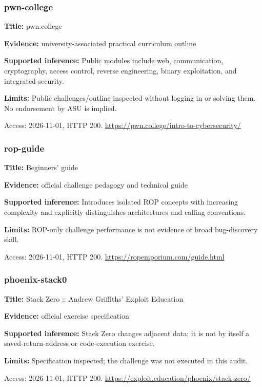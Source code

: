 \subsubsection{pwn-college}
\noindent\textbf{Title:} pwn.college\par
\noindent\textbf{Evidence:} university-associated practical curriculum outline\par
\noindent\textbf{Supported inference:} Public modules include web, communication, cryptography, access control, reverse engineering, binary exploitation, and integrated security.\par
\noindent\textbf{Limits:} Public challenges/outline inspected without logging in or solving them. No endorsement by ASU is implied.\par
\noindent Access: 2026-11-01, HTTP 200. \url{https://pwn.college/intro-to-cybersecurity/}
\subsubsection{rop-guide}
\noindent\textbf{Title:} Beginners' guide\par
\noindent\textbf{Evidence:} official challenge pedagogy and technical guide\par
\noindent\textbf{Supported inference:} Introduces isolated ROP concepts with increasing complexity and explicitly distinguishes architectures and calling conventions.\par
\noindent\textbf{Limits:} ROP-only challenge performance is not evidence of broad bug-discovery skill.\par
\noindent Access: 2026-11-01, HTTP 200. \url{https://ropemporium.com/guide.html}
\subsubsection{phoenix-stack0}
\noindent\textbf{Title:} Stack Zero :: Andrew Griffiths' Exploit Education\par
\noindent\textbf{Evidence:} official exercise specification\par
\noindent\textbf{Supported inference:} Stack Zero changes adjacent data; it is not by itself a saved-return-address or code-execution exercise.\par
\noindent\textbf{Limits:} Specification inspected; the challenge was not executed in this audit.\par
\noindent Access: 2026-11-01, HTTP 200. \url{https://exploit.education/phoenix/stack-zero/}
